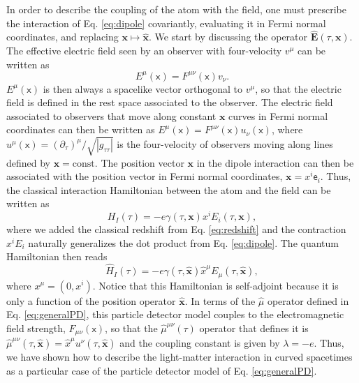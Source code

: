 \documentclass[letterpaper,12pt,titlepage,oneside,final]{book}
\newcommand{\mf}{\mathsf}%
\begin{document}
In order to describe the coupling of the atom with the field, one must prescribe the interaction of Eq. \eqref{eq:dipole} covariantly, evaluating it in Fermi normal coordinates, and replacing $\bm x\longmapsto \hat{\bm x}$. We start by discussing the operator $\hat{\bm E}(\tau,\bm x)$. The effective electric field seen by an observer with four-velocity $v^\mu$ can be written as
\begin{equation}
    E^\mu(\mf x) = F^{\mu\nu}(\mf x)v_\nu.
\end{equation}
$E^\mu(\mf x)$ is then always a spacelike vector orthogonal to $v^\mu$, so that the electric field is defined in the rest space associated to the observer. The electric field associated to observers that move along constant $\bm x$ curves in Fermi normal coordinates can then be written as $E^\mu(\mf x) = F^{\mu\nu}(\mf x)u_\nu(\mf x)$, where $u^\mu(\mf x) = (\partial_\tau)^\mu/\sqrt{|g_{\tau\tau}|}$ is the four-velocity of observers moving along lines defined by $\bm x = \text{const}.$ The position vector $\bm x$ in the dipole interaction can then be associated with the position vector in Fermi normal coordinates, $\bm x = x^i \mf{e}_i$. Thus, the classical interaction Hamiltonian between the atom and the field can be written as
\begin{equation}
    {H}_I(\tau) = -e \gamma(\tau,{\bm x}){x}^i {E}_i(\tau,{\bm x}),
\end{equation}
where we added the classical redshift from Eq. \eqref{eq:redshift} and the contraction $x^i E_i$ naturally generalizes the dot product from Eq. \eqref{eq:dipole}. The quantum Hamiltonian then reads
\begin{equation}
    \hat{H}_I(\tau) = -e \gamma(\tau,\hat{\bm x})\hat{x}^\mu {E}_\mu(\tau,\hat{\bm x}),
\end{equation}
where $x^\mu = (0,x^i)$. Notice that this Hamiltonian is self-adjoint because it is only a function of the position operator $\hat{\bm x}$. In terms of the $\hat{\mu}$ operator defined in Eq. \eqref{eq:generalPD}, this particle detector model couples to the electromagnetic field strength, $F_{\mu\nu}(\mf x)$, so that the $\hat{\mu}^{\mu\nu}(\tau)$ operator that defines it is \mbox{$\hat{\mu}^{\mu\nu}(\tau,\hat{\bm x}) = \hat{x}^\mu u^\nu(\tau,\hat{\bm x})$} and the coupling constant is given by $\lambda = - e$. Thus, we have shown how to describe the light-matter interaction in curved spacetimes as a particular case of the particle detector model of Eq. \eqref{eq:generalPD}.
\end{document}
